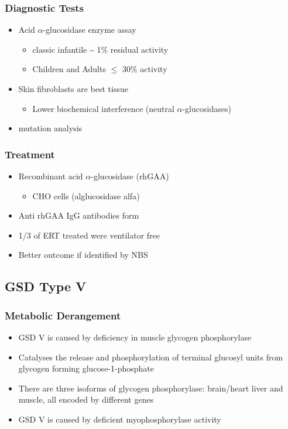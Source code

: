\documentclass{scrartcl}
\begin{document}
\subsubsection{Diagnostic Tests}
\label{sec:orga0d3ff3}
\begin{itemize}
\item Acid \(\alpha\)-glucosidase enzyme assay
\begin{itemize}
\item classic infantile \textasciitilde{} 1\% residual activity
\item Children and Adults \(\le\) 30\% activity
\end{itemize}
\item Skin fibroblasts are best tissue
\begin{itemize}
\item Lower biochemical interference (neutral \(\alpha\)-glucosidases)
\end{itemize}
\item mutation analysis
\end{itemize}
\subsubsection{Treatment}
\label{sec:org3f862dd}
\begin{itemize}
\item Recombinant acid \(\alpha\)-glucosidase (rhGAA)
\begin{itemize}
\item CHO cells (alglucosidase alfa)
\end{itemize}
\item Anti rhGAA IgG antibodies form
\item 1/3 of ERT treated were ventilator free
\item Better outcome if identified by NBS
\end{itemize}

\subsection{GSD Type V}
\label{sec:orgd1ae756}
\subsubsection{Metabolic Derangement}
\label{sec:orgf437faa}
\begin{itemize}
\item GSD V is caused by deficiency in muscle glycogen phosphorylase
\item Catalyses the release and phosphorylation of terminal glucosyl units
from glycogen forming glucose-1-phosphate
\item There are three isoforms of glycogen phosphorylase: brain/heart
liver and muscle, all encoded by different genes
\item GSD V is caused by deficient myophosphorylase activity
\end{itemize}
\end{document}
